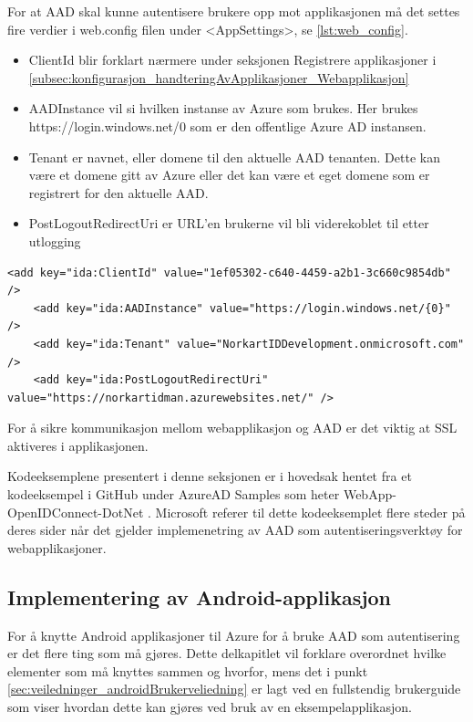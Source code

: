 \bigskip
For at AAD skal kunne autentisere brukere opp mot applikasjonen må det settes fire verdier i web.config filen under
<AppSettings>, se \ref{lst:web_config}. 

\begin{itemize}
    \item ClientId blir forklart nærmere under seksjonen Registrere applikasjoner i \ref{subsec:konfigurasjon_handteringAvApplikasjoner_Webapplikasjon}
    \item AADInstance vil si hvilken instanse av Azure som brukes. Her brukes https://login.windows.net/{0} som er den offentlige Azure AD instansen.
    \item Tenant er navnet, eller domene til den aktuelle  AAD tenanten. Dette kan være et domene gitt av Azure eller det kan være et eget domene som er registrert for den aktuelle AAD.
    \item PostLogoutRedirectUri er URL'en brukerne vil bli viderekoblet til etter utlogging
\end{itemize}

\begin{lstlisting}[caption={Web.config},label={lst:web_config}]
    <add key="ida:ClientId" value="1ef05302-c640-4459-a2b1-3c660c9854db" />
    <add key="ida:AADInstance" value="https://login.windows.net/{0}" />
    <add key="ida:Tenant" value="NorkartIDDevelopment.onmicrosoft.com" />
    <add key="ida:PostLogoutRedirectUri" value="https://norkartidman.azurewebsites.net/" />
\end{lstlisting}

\bigskip
For å sikre kommunikasjon mellom webapplikasjon og AAD er det viktig at SSL aktiveres i applikasjonen.

Kodeeksemplene presentert i denne seksjonen er i hovedsak hentet fra et kodeeksempel i GitHub under AzureAD Samples som heter WebApp-OpenIDConnect-DotNet \cite{WebAppOpenIDConnectDotNet}. Microsoft referer til dette kodeeksemplet flere steder på deres sider når det gjelder implemenetring av AAD som autentiseringsverktøy for webapplikasjoner.

\subsection{Implementering av Android-applikasjon}
\label{subsec:konfigurasjon_handteringAvApplikasjoner_leggetilNyApplikasjon_androidApplikasjon}
For å knytte Android applikasjoner til Azure for å bruke AAD som autentisering er det flere ting som må gjøres. Dette delkapitlet vil forklare overordnet hvilke elementer som må knyttes sammen og hvorfor, mens det i punkt \ref{sec:veiledninger_androidBrukerveliedning} er lagt ved en fullstendig brukerguide som viser hvordan dette kan gjøres ved bruk av en eksempelapplikasjon. \\
\\
